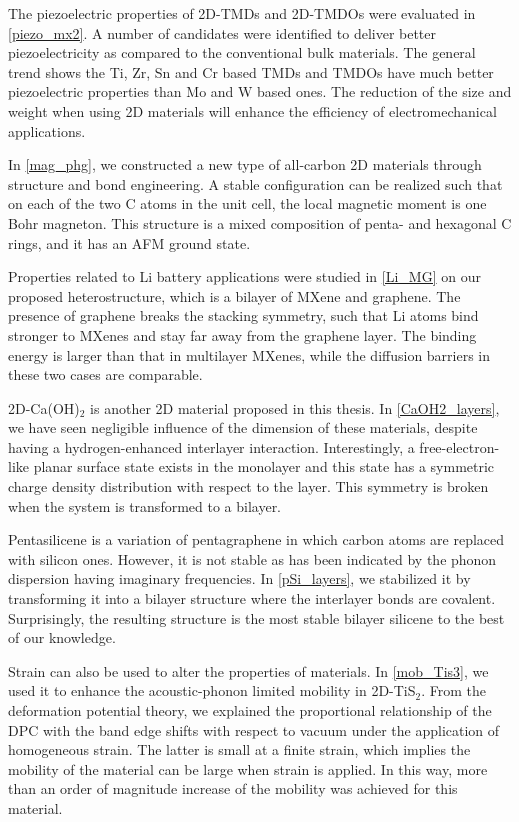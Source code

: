The piezoelectric properties of 2D-TMDs and 2D-TMDOs were evaluated in \autoref{piezo_mx2}. A number of candidates were identified to deliver better piezoelectricity as compared to the conventional bulk materials. The general trend shows the Ti,  Zr, Sn and Cr based TMDs and TMDOs have much better piezoelectric properties than Mo and W based ones. The reduction of the size and weight when using 2D materials will enhance the efficiency of electromechanical applications.

In \autoref{mag_phg}, we constructed a new type of all-carbon 2D materials through structure and bond engineering. A stable configuration can be realized such that on each of the two C atoms in the unit cell, the local magnetic moment is one Bohr magneton. This structure is a mixed composition of penta- and hexagonal C rings, and it has an AFM ground state.

Properties related to Li battery applications were studied in \autoref{Li_MG} on our proposed heterostructure, which is a bilayer of MXene and graphene. The presence of graphene breaks the stacking symmetry, such that Li atoms bind stronger to MXenes and stay far away from the graphene layer. The binding energy is larger than that in multilayer MXenes, while the diffusion barriers in these two cases are comparable. 

2D-Ca(OH)$_2$ is another 2D material proposed in this thesis. In \autoref{CaOH2_layers}, we have seen negligible influence of the dimension of these materials, despite having a hydrogen-enhanced interlayer interaction. Interestingly, a free-electron-like planar surface state exists in the monolayer and this state has a symmetric charge density distribution with respect to the layer. This symmetry is broken when the system is transformed to a bilayer.

Pentasilicene is a variation of pentagraphene in which carbon atoms are replaced with silicon ones. However, it is not stable as has been indicated by the phonon dispersion having imaginary frequencies. In \autoref{pSi_layers}, we stabilized it by transforming it into a bilayer structure where the interlayer bonds are covalent. Surprisingly, the resulting structure is the most stable bilayer silicene to the best of our knowledge.

Strain can also be used to alter the properties of materials. In \autoref{mob_Tis3}, we used it to enhance the acoustic-phonon limited mobility in 2D-TiS$_2$. From the deformation potential theory, we explained the proportional relationship of the DPC with the band edge shifts with respect to vacuum under the application of homogeneous strain. The latter is small at a finite strain, which implies the mobility of the material can be large when strain is applied. In this way, more than an order of magnitude increase of the mobility was achieved for this material.

